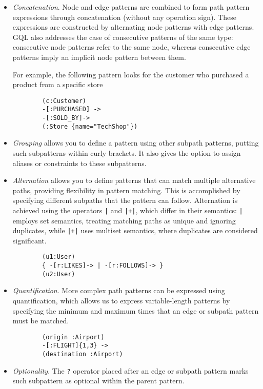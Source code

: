 \begin{itemize}
    \item \emph{Concatenation}. Node and edge patterns are combined to form path pattern expressions through concatenation (without any operation sign). These expressions are constructed by alternating node patterns with edge patterns. GQL also addresses the case of consecutive patterns of the same type: consecutive node patterns refer to the same node, whereas consecutive edge patterns imply an implicit node pattern between them.

    For example, the following pattern looks for the customer who purchased a product from a specific store
    \begin{verbatim}
        (c:Customer) 
        -[:PURCHASED] ->
        -[:SOLD_BY]->
        (:Store {name="TechShop"})
    \end{verbatim}
    
    \item \emph{Grouping} allows you to define a pattern using other subpath patterns, putting such subpatterns within curly brackets. It also gives the option to assign aliases or constraints to these subpatterns.

    \item \emph{Alternation} allows you to define patterns that can match multiple alternative paths, providing flexibility in pattern matching. This is accomplished by specifying different subpaths that the pattern can follow. Alternation is achieved using the operators \verb!|! and \verb!|+|!, which differ in their semantics: \verb!|! employs set semantics, treating matching paths as unique and ignoring duplicates, while \verb!|+|! uses multiset semantics, where duplicates are considered significant.
    \begin{verbatim}
        (u1:User)  
        { -[r:LIKES]-> | -[r:FOLLOWS]-> } 
        (u2:User)
    \end{verbatim}
    
    \item \emph{Quantification}. More complex path patterns can be expressed using quantification, which allows us to express variable-length patterns by specifying the minimum and maximum times that an edge or subpath pattern must be matched.
    \begin{verbatim}
        (origin :Airport) 
        -[:FLIGHT]{1,3} -> 
        (destination :Airport)
    \end{verbatim}

    \item \emph{Optionality}. The \verb|?| operator placed after an edge or subpath pattern marks such subpattern as optional within the parent pattern.

\end{itemize}

